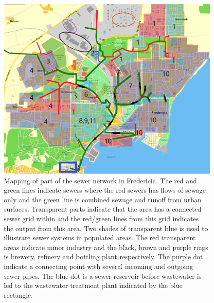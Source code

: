 \begin{figure}[H]
\centering
\includegraphics[width=1\textwidth]{report/system_overview/pictures/kloakgrid_simplified8.png}
\caption{Mapping of part of the sewer network in Fredericia. The red and green lines indicate sewers where the red sewers has flows of sewage only and the green line is combined sewage and runoff from urban surfaces. Transparent parts indicate that the area has a connected sewer grid within and the red/green lines from this grid indicates the output from this area. Two shades of transparent blue is used to illustrate sewer systems in populated areas. The red transparent areas indicate minor industry and the black, brown and purple rings is brewery, refinery and bottling plant respectively. The purple dot indicate a connecting point with several incoming and outgoing sewer pipes. The blue dot is a sewer reservoir before wastewater is led to the wastewater treatment plant indicated by the blue rectangle.}
\label{fig:kloakgrid_simplified}
\end{figure}


